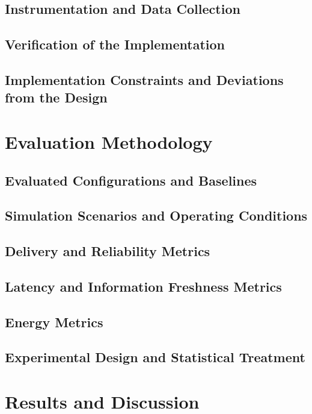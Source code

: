 \section{Instrumentation and Data Collection}
\section{Verification of the Implementation}
\section{Implementation Constraints and Deviations from the Design}


\chapter{Evaluation Methodology}

\section{Evaluated Configurations and Baselines}
\section{Simulation Scenarios and Operating Conditions}
\section{Delivery and Reliability Metrics}
\section{Latency and Information Freshness Metrics}
\section{Energy Metrics}
\section{Experimental Design and Statistical Treatment}


\chapter{Results and Discussion}

